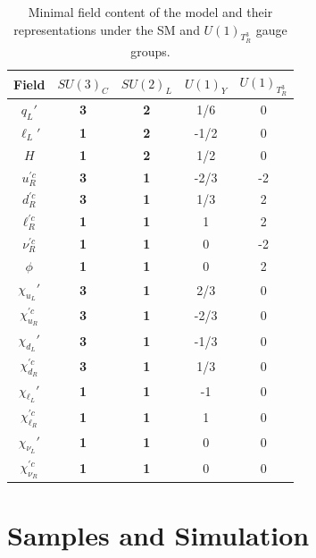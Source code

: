 \begin{table}[h]
    \centering
    \begin{tabular}{ccccc}
    \hline
    \hline
        Field & $SU(3)_C$  & $SU(2)_L$ & $U(1)_Y$ & $U(1)_{T^3_R}$ \\
    \hline\hline
        $q_L'$                    & \bf{3} & \bf{2} & 1/6 & 0\\
        $\ell_L'$                 & \bf{1} & \bf{2} & -1/2 & 0\\
        $H$                         & \bf{1} & \bf{2} & 1/2 & 0\\
        \hline
        $u_R^{\prime c}$          & \bf{3} & \bf{1} & -2/3 & -2\\
        $d_R^{\prime c}$          & \bf{3} & \bf{1} & 1/3 & 2\\
        $\ell_R^{\prime c}$       & \bf{1} & \bf{1} & 1 & 2\\
        $\nu_R^{\prime c}$        & \bf{1} & \bf{1} & 0 & -2\\
        $\phi$                      & \bf{1} & \bf{1} & 0 & 2\\
        \hline
        $\chi_{u_L}'$               & \bf{3} & \bf{1} & 2/3 & 0\\
        $\chi_{u_R}^{\prime c}$     & \bf{3} & \bf{1} & -2/3 & 0\\
        $\chi_{d_L}'$               & \bf{3} & \bf{1} & -1/3 & 0\\
        $\chi_{d_R}^{\prime c}$     & \bf{3} & \bf{1} & 1/3 & 0\\
        $\chi_{\ell_L}'$            & \bf{1} & \bf{1} & -1 & 0\\
        $\chi_{\ell_R}^{\prime c}$  & \bf{1} & \bf{1} & 1 & 0\\
        $\chi_{\nu_L}'$             & \bf{1} & \bf{1} & 0 & 0\\
        $\chi_{\nu_R}^{\prime c}$   & \bf{1} & \bf{1} & 0 & 0\\
    \hline
    \hline
    \end{tabular}
    \caption{Minimal field content of the model and their representations under the SM and $U(1)_{T^3_R}$ gauge groups.}
    \label{tab:QMnumbers}
\end{table}

\section{Samples and Simulation}\label{sec:sims}

